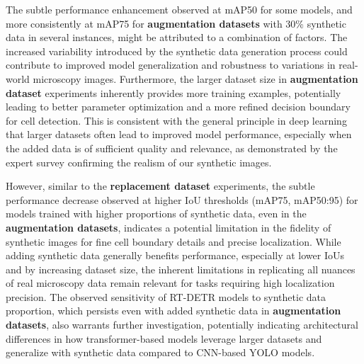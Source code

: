 The subtle performance enhancement observed at mAP\@50 for some models, and more consistently at mAP\@75 for \textbf{augmentation datasets} with 30\% synthetic data in several instances, might be attributed to a combination of factors.
The increased variability introduced by the synthetic data generation process could contribute to improved model generalization and robustness to variations in real-world microscopy images.
Furthermore, the larger dataset size in \textbf{augmentation dataset} experiments inherently provides more training examples, potentially leading to better parameter optimization and a more refined decision boundary for cell detection.
This is consistent with the general principle in deep learning that larger datasets often lead to improved model performance, especially when the added data is of sufficient quality and relevance, as demonstrated by the expert survey confirming the realism of our synthetic images.

However, similar to the \textbf{replacement dataset} experiments, the subtle performance decrease observed at higher IoU thresholds (mAP\@75, mAP\@50:95) for models trained with higher proportions of synthetic data, even in the \textbf{augmentation datasets}, indicates a potential limitation in the fidelity of synthetic images for fine cell boundary details and precise localization.
While adding synthetic data generally benefits performance, especially at lower IoUs and by increasing dataset size, the inherent limitations in replicating all nuances of real microscopy data remain relevant for tasks requiring high localization precision.
The observed sensitivity of RT-DETR models to synthetic data proportion, which persists even with added synthetic data in \textbf{augmentation datasets}, also warrants further investigation, potentially indicating architectural differences in how transformer-based models leverage larger datasets and generalize with synthetic data compared to CNN-based YOLO models.

